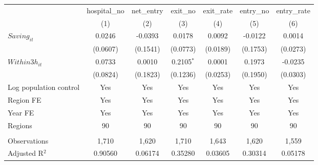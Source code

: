 \begingroup
\centering
\begin{tabular}{lcccccc}
   \toprule
                          & hospital\_no  & net\_entry  & exit\_no     & exit\_rate  & entry\_no  & entry\_rate \\    
                          & (1)           & (2)         & (3)          & (4)         & (5)        & (6)\\  
   \midrule 
   $Saving_{it}$          & 0.0246        & -0.0393     & 0.0178       & 0.0092      & -0.0122    & 0.0014\\   
                          & (0.0607)      & (0.1541)    & (0.0773)     & (0.0189)    & (0.1753)   & (0.0273)\\   
   $Within3h_{it}$        & 0.0733        & 0.0010      & 0.2105$^{*}$ & 0.0001      & 0.1973     & -0.0235\\   
                          & (0.0824)      & (0.1823)    & (0.1236)     & (0.0253)    & (0.1950)   & (0.0303)\\   
   Log population control & Yes           & Yes         & Yes          & Yes         & Yes        & Yes\\  
   Region FE              & Yes           & Yes         & Yes          & Yes         & Yes        & Yes\\  
   Year FE                & Yes           & Yes         & Yes          & Yes         & Yes        & Yes\\  
   Regions                & 90            & 90          & 90           & 90          & 90         & 90\\  
    \\
   Observations           & 1,710         & 1,620       & 1,710        & 1,643       & 1,620      & 1,559\\  
   Adjusted R$^2$         & 0.90560       & 0.06174     & 0.35280      & 0.03605     & 0.30314    & 0.05178\\  
   \bottomrule
\end{tabular}
\par\endgroup
